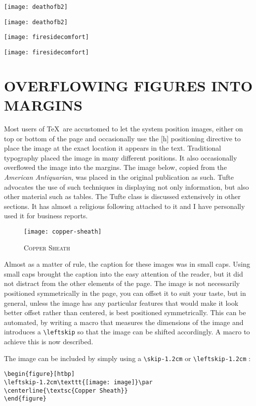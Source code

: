 \newpage
{}

\minipage{\textwidth}
\texttt{[image: deathofb2]}
\endminipage

\hspace*{-1.07\textwidth}\minipage{\textwidth}\texttt{[image: deathofb2]}
\endminipage

\minipage{\textwidth}
\texttt{[image: firesidecomfort]}
\endminipage

\hspace*{-1.12\textwidth}\minipage[t]{\textwidth}\texttt{[image: firesidecomfort]}
\endminipage

\vspace{-10cm}
\hspace*{11cm}\begin{minipage}[t]{4.5cm}
\lorem
\end{minipage}

\section{OVERFLOWING FIGURES INTO MARGINS}

Most users of \TeX\ are accustomed to let the system position images, either on top or bottom of the page and occasionally use the [h] positioning directive to place the image at the exact location it appears in the text. Traditional typography placed the image in many different positions. It also occasionally overflowed the image into the margins. The image below, copied from the \textit{American Antiquarian}, was placed in the original publication as such. Tufte advocates the use of such techniques in displaying not only information, but also other material such as tables. The Tufte class is discussed extensively in other sections. It has almost a religious following attached to it and I have personally used it for business reports.

\begin{figure}[htbp]
\leftskip-1.2cm\texttt{[image: copper-sheath]}\par
\centerline{\textsc{Copper Sheath}}
\end{figure}

Almost as a matter of rule, the caption for these images was in small caps. Using small caps brought the caption into the easy attention of the reader, but it did not distract from the other elements of the page.
The image is not necessarily positioned symmetrically in the page, you can offset it to suit your taste, but in general, unless the image has any particular features that would make it look better offset rather than centered, is best positioned symmetrically. This can be automated, by writing a macro that measures the dimensions of the image and introduces a \verb+\leftskip+ so that the image can be shifted accordingly. A macro to achieve this is now described.


The image can be included by simply using a \verb+\skip-1.2cm+ or \verb+\leftskip-1.2cm+ :

\begin{verbatim}
\begin{figure}[htbp]
\leftskip-1.2cm\texttt{[image: image]}\par
\centerline{\textsc{Copper Sheath}}
\end{figure}
\end{verbatim}

